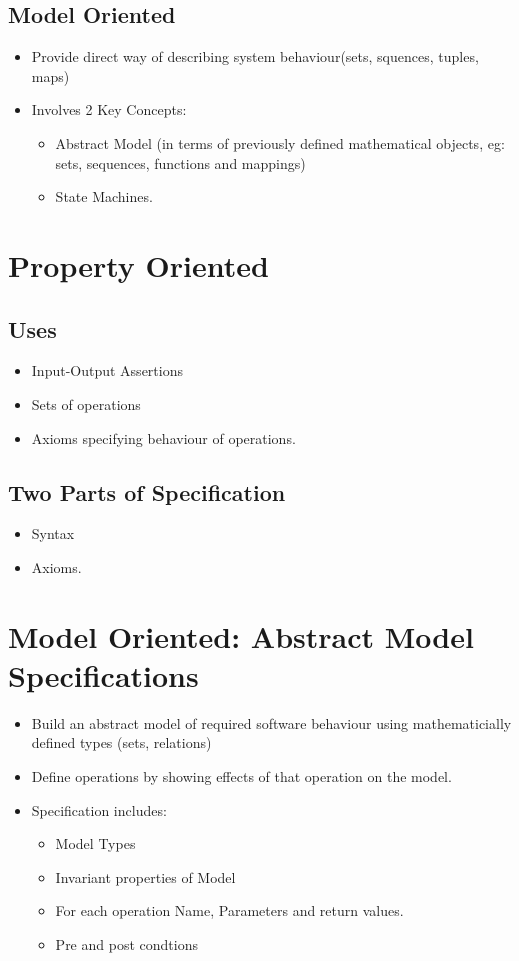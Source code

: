 \documentclass{article}
\begin{document}
    \subsection{Model Oriented}\begin{itemize}
        \item Provide direct way of describing system behaviour(sets, squences, tuples, maps)
        \item Involves 2 Key Concepts:\begin{itemize}
            \item Abstract Model (in terms of previously defined mathematical objects, eg: sets, sequences, functions and mappings)
            \item State Machines.
        \end{itemize}
    \end{itemize}
    \section{Property Oriented}
    \subsection{Uses}\begin{itemize}
        \item Input-Output Assertions
        \item Sets of operations
        \item Axioms specifying behaviour of operations.
    \end{itemize}
    \subsection{Two Parts of Specification}\begin{itemize}
        \item Syntax
        \item Axioms.
    \end{itemize}
    \section{Model Oriented: Abstract Model Specifications}
    \begin{itemize}
        \item Build an abstract model of required software behaviour using mathematicially defined types (sets, relations)
        \item Define operations by showing effects of that operation on the model.
        \item Specification includes:\begin{itemize}
            \item Model Types
            \item Invariant properties of Model
            \item For each operation \- Name, Parameters and return values.
            \item Pre and post condtions
        \end{itemize}
    \end{itemize}
\end{document}
